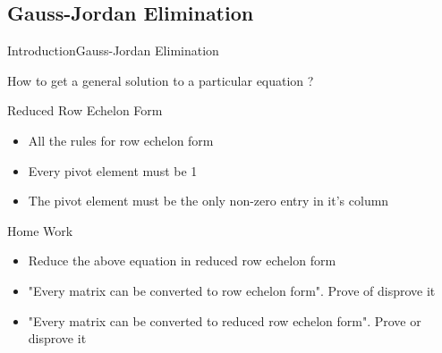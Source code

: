 \documentclass[10pt]{beamer}
\begin{document}
\subsection{Gauss-Jordan Elimination}
\begin{frame}[shrink=20]{Introduction}{Gauss-Jordan Elimination}

\vspace{0.25in}

How to get a general solution to a particular equation ?

\begin{block}{Reduced Row Echelon Form}
\begin{itemize}
\item All the rules for row echelon form
\item Every pivot element must be 1
\item The pivot element must be the only non-zero entry in it's column
\end{itemize}
\end{block}

\begin{block}{Home Work}
\begin{itemize}
\item Reduce the above equation in reduced row echelon form
\item "Every matrix can be converted to row echelon form". Prove of disprove it
\item "Every matrix can be converted to reduced row echelon form". Prove or disprove it
\end{itemize}
\end{block}

\end{frame}




{\1
\begin{frame}
\end{frame}}
\end{document}
